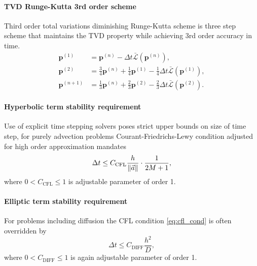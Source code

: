 \paragraph{TVD Runge-Kutta 3rd order scheme}
Third order total variations diminishing Runge-Kutta scheme \cite{Gottlieb2002} 
is three step scheme that maintains the TVD property while achieving 3rd order 
accuracy in time.
\begin{equation}    
\begin{aligned}
\mathbf{p}^{(1)} &= \mathbf{p}^{(n)} - \Delta t  
\bar{\mathcal{L}}(\mathbf{p}^{(n)}), \\
\mathbf{\mathbf{p}}^{(2)} &= \frac{3}{4}\mathbf{p}^{(n)} 
+\frac{1}{4}\mathbf{p}^{(1)} - \frac{1}{4}\Delta t 
\bar{\mathcal{L}}(\mathbf{p}^{(1)}),\\
\mathbf{p}^{(n+1)} &= \frac{1}{3}\mathbf{p}^{(n)} 
+\frac{2}{3}\mathbf{p}^{(2)} - \frac{2}{3}\Delta t 
\bar{\mathcal{L}}(\mathbf{p}^{(2)}).
\end{aligned}
\end{equation}


\paragraph{Hyperbolic term stability requirement}
Use of explicit time stepping solvers poses strict upper bounds on size of time step, 
for purely advection problems Courant-Friedrichs-Lewy condition adjusted for high order 
approximation mandates \cite[p. 5]{Chalons2018}
\begin{equation}
\label{eq:cfl_cond}
\Delta t \leq C_\mathrm{CFL}\frac{h}{\left\lVert\vec{a}\right\rVert} \cdot \frac{1}{2M + 1},
\end{equation}
where $0 < C_\mathrm{CFL} \leq 1$ is adjustable parameter of order 1.


\paragraph{Elliptic term stability requirement}
For problems including diffusion the CFL condition \eqref{eq:cfl_cond} is often 
overridden by \cite{Hesthaven2008}
\begin{equation}
\Delta t \leq C_\mathrm{DIFF}\frac{h^2}{D}, %
\end{equation} 
where $0 < C_\mathrm{DIFF} \leq 1$ is again adjustable parameter of order 1.

\newpage
